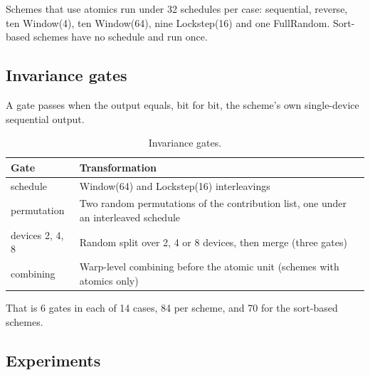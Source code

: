 \documentclass[3p,10pt]{elsarticle}
\begin{document}
Schemes that use atomics run under 32 schedules per case: sequential,
reverse, ten Window(4), ten Window(64), nine Lockstep(16) and one
FullRandom. Sort-based schemes have no schedule and run once.

\hypertarget{invariance-gates}{%
\subsection{Invariance gates}\label{invariance-gates}}

A gate passes when the output equals, bit for bit, the scheme's own
single-device sequential output.

\begin{table}[!htbp]\centering\small\setlength{\tabcolsep}{4pt}
\caption{Invariance gates.}\label{tab:10}
\begin{tabularx}{\linewidth}{>{\raggedright\arraybackslash\hsize=0.566\hsize}X>{\raggedright\arraybackslash\hsize=1.434\hsize}X}
\toprule
Gate & Transformation \\
\midrule
schedule & Window(64) and Lockstep(16) interleavings \\
permutation & Two random permutations of the contribution list, one under an
interleaved schedule \\
devices 2, 4, 8 & Random split over 2, 4 or 8 devices, then merge (three gates) \\
combining & Warp-level combining before the atomic unit (schemes with atomics only) \\
\bottomrule
\end{tabularx}
\end{table}

That is 6 gates in each of 14 cases, 84 per scheme, and 70 for the
sort-based schemes.

\hypertarget{experiments}{%
\subsection{Experiments}\label{experiments}}
\end{document}

